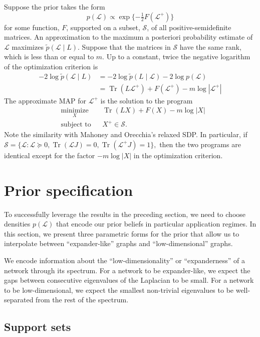 \documentclass[12pt]{article}
\DeclareMathOperator*{\Tr}{Tr}
\theoremstyle{plain}
\begin{document}
Suppose the prior takes the form
\[
  p(\mathcal{L}) \propto \exp\{ -\tfrac{1}{2} F(\mathcal{L^+}) \}
\]
for some function, $F$, supported on a subset, $\mathcal{S}$, of all
positive-semidefinite matrices.  An approximation to the
maximum a posteriori probability estimate of $\mathcal{L}$ maximizes
$\tilde p(\mathcal{L} \mid L)$.  Suppose that the
matrices in $\mathcal{S}$ have the same rank, which is less than or
equal to $m$.
Up to a constant, twice the negative logarithm of the optimization criterion is
\begin{align*}
  -2 \log \tilde p(\mathcal{L} \mid L)
   &= - 2 \log \tilde p(L \mid \mathcal{L}) - 2 \log p(\mathcal{L}) \\
   &= \Tr(L \mathcal{L}^+) + F(\mathcal{L^+}) - m \log | \mathcal{L}^+ |
\end{align*}
The approximate MAP for $\mathcal{L}^+$ is the solution to the program
\[
\begin{aligned}
  & \underset{X}{\text{minimize}}
  & & \Tr(L X) + F(X) - m \log |X| \\
  & \text{subject to}
  & & X^+ \in \mathcal{S}.
\end{aligned}
\]
Note the similarity with Mahoney and Orecchia's relaxed SDP.
In particular, if
\(
  \mathcal{S} = \{ \mathcal{L} : \mathcal{L} \succeq 0,
  \Tr(\mathcal{L} J) = 0, \Tr(\mathcal{L}^{+} J) = 1 \},
\)
then the two programs are identical except for the factor
$-m \log |X|$ in the optimization criterion.


\section{Prior specification}

To successfully leverage the results in the preceding section, we need
to choose densities $p(\mathcal{L})$ that encode our prior beliefs in
particular application regimes.  In this section, we present three
parametric forms for the prior that allow us to interpolate between
``expander-like'' graphs and ``low-dimensional'' graphs.

We encode information about the
``low-dimensionality'' or ``expanderness'' of a network through its
spectrum.  For a network to be expander-like, we expect the gaps
between consecutive eigenvalues of the Laplacian to be small.  For a
network to be low-dimensional, we expect the smallest non-trivial
eigenvalues to be well-separated from the rest of the spectrum.


\subsection{Support sets}
\end{document}
